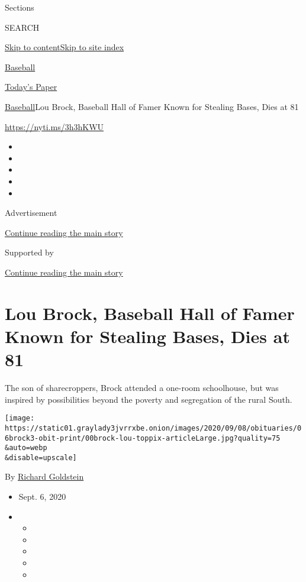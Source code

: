 Sections

SEARCH

\protect\hyperlink{site-content}{Skip to
content}\protect\hyperlink{site-index}{Skip to site index}

\href{https://www.nytimes3xbfgragh.onion/section/sports/baseball}{Baseball}

\href{https://myaccount.nytimes3xbfgragh.onion/auth/login?response_type=cookie\&client_id=vi}{}

\href{https://www.nytimes3xbfgragh.onion/section/todayspaper}{Today's
Paper}

\href{/section/sports/baseball}{Baseball}\textbar{}Lou Brock, Baseball
Hall of Famer Known for Stealing Bases, Dies at 81

\url{https://nyti.ms/3h3hKWU}

\begin{itemize}
\item
\item
\item
\item
\item
\end{itemize}

Advertisement

\protect\hyperlink{after-top}{Continue reading the main story}

Supported by

\protect\hyperlink{after-sponsor}{Continue reading the main story}

\hypertarget{lou-brock-baseball-hall-of-famer-known-for-stealing-bases-dies-at-81}{%
\section{Lou Brock, Baseball Hall of Famer Known for Stealing Bases,
Dies at
81}\label{lou-brock-baseball-hall-of-famer-known-for-stealing-bases-dies-at-81}}

The son of sharecroppers, Brock attended a one-room schoolhouse, but was
inspired by possibilities beyond the poverty and segregation of the
rural South.

\texttt{[image: https://static01.graylady3jvrrxbe.onion/images/2020/09/08/obituaries/06brock3-obit-print/00brock-lou-toppix-articleLarge.jpg?quality=75\\\&auto=webp\\\&disable=upscale]}

By
\href{https://www.nytimes3xbfgragh.onion/by/richard-goldstein}{Richard
Goldstein}

\begin{itemize}
\item
  Sept. 6, 2020
\item
  \begin{itemize}
  \item
  \item
  \item
  \item
  \item
  \end{itemize}
\end{itemize}

